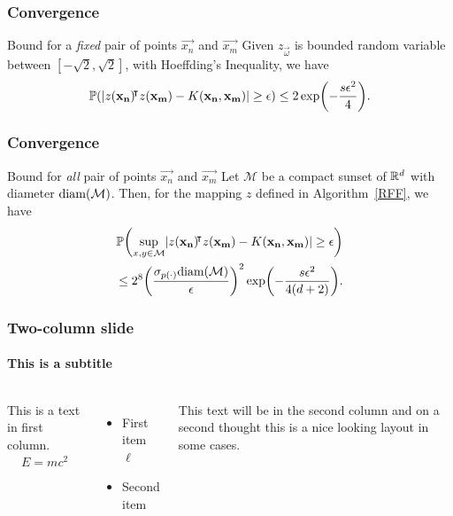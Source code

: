 \documentclass[10pt]{../formats/RU}
\begin{document}
\begin{frame}
  \frametitle{Convergence}
  \begin{exampleblock}{Bound for a \emph{fixed} pair of points $\vec{x_n}$ and $\vec{x_m}$}
    Given $z_{\vec{\omega}}$ is bounded random variable between $[-\sqrt{2}, \sqrt{2}]$, with Hoeffding's Inequality, we have
    \begin{align*}
      \P{\abs{z(\vec{x_n})\trn z(\vec{x_m})-K(\vec{x_n}, \vec{x_m})}\geq \epsilon} \leq 2\exp\parens*{-\frac{s\epsilon^2}{4}}.
    \end{align*}      
  \end{exampleblock}
\end{frame}
\begin{frame}
  \frametitle{Convergence}
  \begin{exampleblock}{Bound for \emph{all} pair of points $\vec{x_n}$ and $\vec{x_m}$}
    Let $\mathcal{M}$ be a compact sunset of $\mathbb{R}^d$ with diameter $\textnormal{diam}(\mathcal{M})$. Then, for the mapping $z$ defined in Algorithm~\ref{RFF}, we have
    \begin{align*}
      \P{\sup_{x,y\in\mathcal{M}}\abs{z(\vec{x_n})\trn z(\vec{x_m})-K(\vec{x_n}, \vec{x_m})}\geq \epsilon} \\
      \leq 2^8\parens*{\frac{\sigma_{p(\cdot)}\textnormal{diam}(\mathcal{M})}{\epsilon}}^2\exp\parens*{-\frac{s\epsilon^2}{4(d+2)}}.
    \end{align*}
  \end{exampleblock}
\end{frame}
\begin{frame}
\frametitle{Two-column slide}
\framesubtitle{This is a subtitle}

\begin{columns}

This is a text in first column.
\begin{align*}
  E=mc^2
\end{align*}
\begin{itemize}
\item First item $\ell$
\item Second item
\end{itemize}

This text will be in the second column
and on a second thought this is a nice looking
layout in some cases.
\end{columns}
\end{frame}
\end{document}

